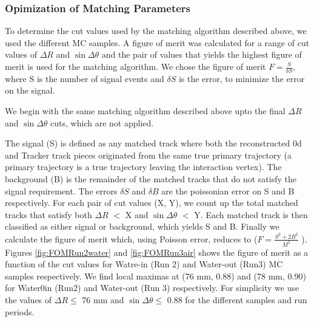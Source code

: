 \subsubsection{Opimization of Matching Parameters}
\label{MatchCutOpt}

To determine the cut values used 
by the matching algorithm described above, 
we used the different MC samples.
A figure of merit was calculated for a range of cut values of $\Delta R$ and $\sin\Delta\theta$ and the pair of values that yields the highest figure of merit is used for the matching algorithm. We chose the figure of merit $ F = \frac{S}{\delta S}$, where S is the number of signal events and $\delta S$ is the error, to minimize the error on the signal. 

We begin with the same matching algorithm described above upto the 
final $\Delta R$ and $\sin\Delta\theta$ cuts, which are not applied. 

The signal (S) is defined as any matched track where both 
the reconstructed \p0d and Tracker track pieces originated 
from the same true primary trajectory 
(a primary trajectory is a true trajectory leaving the interaction vertex). 
The background (B) is the remainder of the matched tracks that do not satisfy 
the signal requirement. 
The errors $\delta S$ and $\delta B$ are the poissonian error on S and B 
respectively. For each pair of cut values (X, Y), 
we count up the total matched tracks that satisfy 
both $\Delta R$ \(<\) X and $\sin\Delta\theta$ \(<\) Y. 
Each matched track is then classified as either signal or background, 
which yields S and B. Finally we calculate the figure of merit which, 
using Poisson error, reduces to ($ F = \frac{S^2+2 B^2}{M^2}$ ). 
Figures \ref{fig:FOMRun2water} and \ref{fig:FOMRun3air} 
shows the figure of merit as a function of 
the cut values for Watre-in (Run 2) and Water-out (Run3) MC samples 
respectively. 
We find local maximas at (76 mm, 0.88) and (78 mm, 0.90) 
for Water0in (Run2) and Water-out (Run 3) respectively. 
For simplicity 
we use the values 
of 
$\Delta R \le$ 76 mm and $\sin\Delta\theta \le$ 0.88 
for the different samples and run periods.

